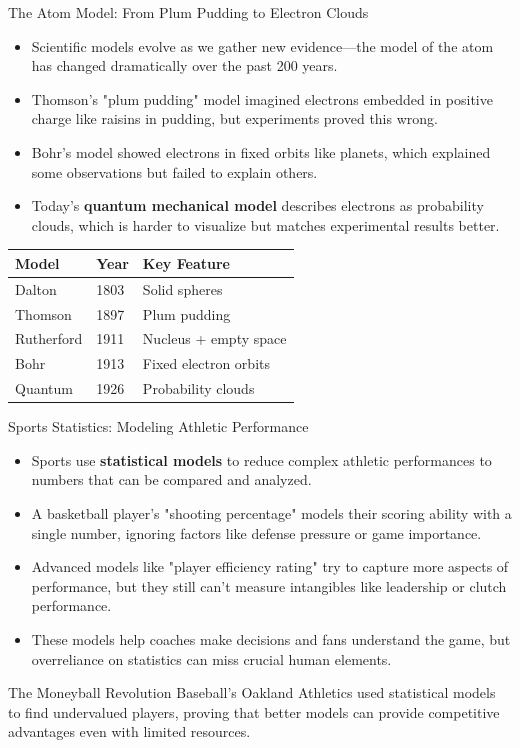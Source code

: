 \documentclass{beamer}
\begin{document}
	\begin{frame}{The Atom Model: From Plum Pudding to Electron Clouds}
		\begin{itemize}
			\item Scientific models evolve as we gather new evidence—the model of the atom has changed dramatically over the past 200 years.
			\item Thomson's "plum pudding" model imagined electrons embedded in positive charge like raisins in pudding, but experiments proved this wrong.
			\item Bohr's model showed electrons in fixed orbits like planets, which explained some observations but failed to explain others.
			\item Today's \textbf{quantum mechanical model} describes electrons as probability clouds, which is harder to visualize but matches experimental results better.
		\end{itemize}
		
		\begin{table}
			\centering
			\small
			\begin{tabular}{lll}
				\toprule
				Model & Year & Key Feature \\
				\midrule
				Dalton & 1803 & Solid spheres \\
				Thomson & 1897 & Plum pudding \\
				Rutherford & 1911 & Nucleus + empty space \\
				Bohr & 1913 & Fixed electron orbits \\
				Quantum & 1926 & Probability clouds \\
				\bottomrule
			\end{tabular}
		\end{table}
	\end{frame}
	
	\begin{frame}{Sports Statistics: Modeling Athletic Performance}
		\begin{itemize}
			\item Sports use \textbf{statistical models} to reduce complex athletic performances to numbers that can be compared and analyzed.
			\item A basketball player's "shooting percentage" models their scoring ability with a single number, ignoring factors like defense pressure or game importance.
			\item Advanced models like "player efficiency rating" try to capture more aspects of performance, but they still can't measure intangibles like leadership or clutch performance.
			\item These models help coaches make decisions and fans understand the game, but overreliance on statistics can miss crucial human elements.
		\end{itemize}
		
		\begin{alertblock}{The Moneyball Revolution}
			Baseball's Oakland Athletics used statistical models to find undervalued players, proving that better models can provide competitive advantages even with limited resources.
		\end{alertblock}
	\end{frame}
	
\end{document}
